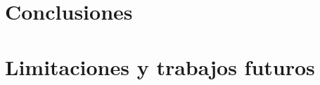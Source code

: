 \documentclass[a4paper,12pt]{book}
\theoremstyle{break}
\begin{document}
\chapter{Conclusiones}\label{chapter:07}


\chapter{Limitaciones y trabajos futuros}\label{chapter:08}


\newpage



\end{document}
